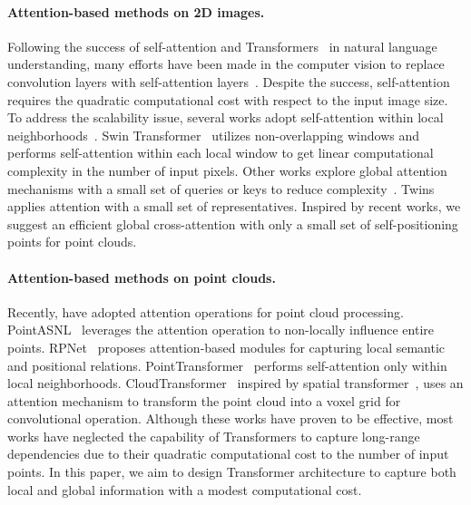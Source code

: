 \documentclass[10pt,twocolumn,letterpaper]{article}
\begin{document}
\paragraph{Attention-based methods on 2D images.}
Following the success of self-attention and Transformers~\cite{vaswani2017attention} in natural language understanding, many efforts have been made in the computer vision to replace convolution layers with self-attention layers~\cite{dosovitskiy2020image,ramachandran2019stand,hu2019local,parmar2018image,chen2020generative,cordonnier2019relationship}.
Despite the success, self-attention requires the quadratic computational cost with respect to the input image size.
To address the scalability issue, several works adopt self-attention within local neighborhoods~\cite{liu2021swin,wang2021pyramid}.
Swin Transformer~\cite{liu2021swin} utilizes non-overlapping windows and performs self-attention within each local window to get linear computational complexity in the number of input pixels.
Other works explore global attention mechanisms with a small set of queries or keys to reduce complexity~\cite{chu2021Twins,jaegle2021perceiver,zhu2020deformable}.
Twins~\cite{chu2021Twins} applies attention with a small set of representatives. Inspired by recent works, we suggest an efficient global cross-attention with only a small set of self-positioning points for point clouds.

\paragraph{Attention-based methods on point clouds.}
Recently, \cite{yan2020pointasnl,xie2018attentional,lee2019set,guo2021pct,zhao2021point,ran2021learning,mazur2021cloud,choe2022pointmixer, xiang2021walk} have adopted attention operations for point cloud processing. 
PointASNL~\cite{yan2020pointasnl} leverages the attention operation to non-locally influence entire points.
RPNet~\cite{ran2021learning} proposes attention-based modules for capturing local semantic and positional relations.
PointTransformer~\cite{zhao2021point} performs self-attention only within local neighborhoods.
CloudTransformer~\cite{mazur2021cloud} inspired by spatial transformer~\cite{jaderberg2015spatial}, uses an attention mechanism to transform the point cloud into a voxel grid for convolutional operation.
Although these works have proven to be effective, most works have neglected the capability of Transformers to capture long-range dependencies due to their quadratic computational cost to the number of input points.
In this paper, we aim to design Transformer architecture to capture both local and global information with a modest computational cost.
\end{document}
